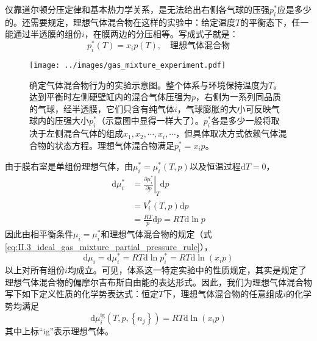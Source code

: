 \documentclass[main.tex]{subfiles}
\begin{document}
仅靠道尔顿分压定律和基本热力学关系，是无法给出右侧各气球的压强$p^*_i$应是多少的。还需要规定，理想气体混合物在这样的实验中：给定温度$T$的平衡态下，任一能通过半透膜的组份$i$，在膜两边的分压相等。写成式子就是：
\begin{equation}
    \label{eq:II.3_ideal_gas_mixture_partial_pressure_rule}
    p^*_i\left(T\right)=x_ip\left(T\right),\quad\text{理想气体混合物}
\end{equation}

\begin{figure}[ht]
    \centering
    \texttt{[image: ../images/gas\_mixture\_experiment.pdf]}
    \caption{确定气体混合物行为的实验示意图。整个体系与环境保持温度为$T$。达到平衡时左侧硬壁缸内的混合气体压强为$p$，右侧为一系列同品质的气球，经半透膜，它们只含有纯气体$i$，气球膨胀的大小可反映气球内的压强大小$p^*_i$（示意图中显得一样大了）。$p^*_i$各是多少一般将取决于左侧混合气体的组成$x_1,x_2,\cdots,x_i,\cdots$，但具体取决方式依赖气体混合物的状态方程。理想气体混合物满足$p^*_i=x_ip$。}
    \label{fig:gas_mixture_experiment}
\end{figure}

由于膜右室是单组份理想气体，由$\mu_i^*=\mu_i^*\left(T,p\right)$以及恒温过程$\mathrm{d}T=0$，
\begin{align*}
    \mathrm{d}\mu_i^* & =\left.\frac{\partial\mu_i^*}{\partial p}\right|_{T}\mathrm{d}p \\
                      & =V_i^*\left(T,p\right)\mathrm{d}p                               \\
                      & =\frac{RT}{p}\mathrm{d}p=RT\mathrm{d}\ln p
\end{align*}
因此由相平衡条件$\mu_i=\mu_i^*$和理想气体混合物的规定（式\eqref{eq:II.3_ideal_gas_mixture_partial_pressure_rule}），
\[\mathrm{d}\mu_i=\mathrm{d}\mu_i^*=RT\mathrm{d}\ln p_i^*=RT\mathrm{d}\ln\left(x_ip\right)\]
以上对所有组份$i$均成立。可见，体系这一特定实验中的性质规定，其实是规定了理想气体混合物的偏摩尔吉布斯自由能的表达形式。因此，我们为理想气体混合物写下如下定义性质的化学势表达式：恒定$T$下，理想气体混合物的任意组成$i$的化学势均满足
\begin{equation}\label{eq:II.3_def_ideal_gas_mixture_mu}
    \mathrm{d}\mu_i^\text{ig}\left(T,p,\left\{n_j\right\}\right)=RT\mathrm{d}\ln\left(x_i p\right)
\end{equation}
其中上标“ig”表示理想气体。
\end{document}
